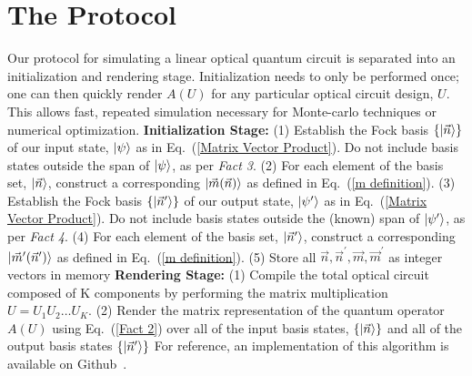 \documentclass[aps,pra,twocolumn,showpacs,superscriptaddress,floatfix,10pt]{revtex4}
\begin{document}
\section{The Protocol}
\label{Section on Protocol}
Our protocol for simulating a linear optical quantum circuit is separated into an initialization and rendering stage. Initialization needs to only be performed once; one can then quickly render $A(U)$ for any particular optical circuit design, $U$. This allows fast, repeated simulation necessary for Monte-carlo techniques or numerical optimization.
\newline
\newline
\textbf{Initialization Stage:}
\newline
\newline
		(1)  Establish the Fock basis $\{\ket{\vec{n}} \}$ of our input state, $\ket{\psi}$ as in Eq.~(\ref{Matrix Vector Product}). Do not include basis states outside the span of $\ket{\psi}$, as per \textit{Fact 3}.
		\newline
		\newline
		(2) For each element of the basis set, $\ket{\vec{n}}$, construct a corresponding $\ket{\vec{m}(\vec{n})}$ as defined in Eq.~(\ref{m definition}).
		\newline
		\newline
		(3) Establish the Fock basis $\{\ket{\vec{n}^\prime}\}$ of our output state, $\ket{\psi^\prime}$ as in Eq.~(\ref{Matrix Vector Product}). Do not include basis states outside the (known) span of $\ket{\psi^\prime}$, as per \textit{Fact 4}.
		\newline
		\newline
		(4)  For each element of the basis set, $\ket{\vec{n}^\prime}$, construct a corresponding $\ket{\vec{m}^\prime(\vec{n}^\prime)}$ as defined in Eq.~(\ref{m definition}).
		\newline
		\newline
		(5) Store all $\vec{n}, \vec{n}^\prime, \vec{m}, \vec{m}^\prime$ as integer vectors in memory
		\newline
		\newline
\textbf{Rendering Stage:}
\newline
\newline
		(1)  Compile the total optical circuit composed of K components by performing the matrix multiplication $ U = U_1 U_2 \dots U_K $.
		\newline
		\newline
		(2) Render the matrix representation of the quantum operator $A(U)$ using Eq.~(\ref{Fact 2}) over all of the input basis states, $\{\ket{\vec{n}}\}$ and all of the output basis states $\{\ket{\vec{n}^\prime}\}$
\newline
\newline
For reference, an implementation of this algorithm is available on Github~\cite{GitHub}.
\end{document}
